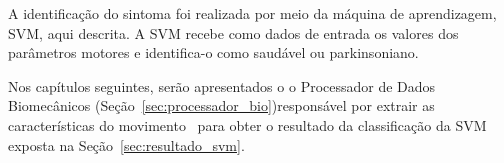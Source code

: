 A identificação do sintoma foi realizada por meio da máquina de aprendizagem, SVM, aqui descrita. A SVM recebe como dados de entrada os valores dos parâmetros motores e identifica-o como saudável ou parkinsoniano.

Nos capítulos seguintes, serão apresentados o o Processador de Dados Biomecânicos (Seção~\ref{sec:processador_bio})responsável por extrair as características do movimento~\cite{mcginnis2013biomechanics} para obter o resultado da classificação da SVM exposta na Seção~\ref{sec:resultado_svm}.

%
%

